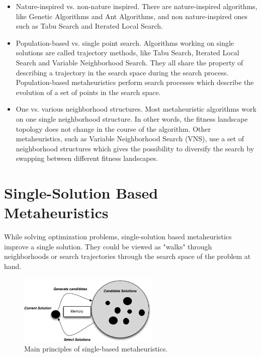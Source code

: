 \begin{itemize}
\item Nature-inspired vs. non-nature inspired. There are nature-inspired algorithms, like Genetic Algorithms and Ant Algorithms, and non nature-inspired ones such as Tabu Search and Iterated Local Search. 

\item Population-based vs. single point search. Algorithms working on single solutions are called trajectory methods, like Tabu Search, Iterated Local Search and Variable Neighborhood Search. They all share the property of describing a trajectory in the search space during the search process. Population-based metaheuristics perform search processes which describe the evolution of a set of points in the search space.

\item One vs. various neighborhood structures. Most metaheuristic algorithms work on one single neighborhood structure. In other words, the fitness landscape topology does not change in the course of the algorithm. Other metaheuristics, such as Variable Neighborhood Search (VNS), use a set of neighborhood structures which gives the possibility to diversify the search by swapping between different fitness
landscapes.
\end{itemize}

\section{Single-Solution Based Metaheuristics}

While solving optimization problems, single-solution based metaheuristics
 improve a single solution. They could be viewed as "walks" through neighborhoods or search trajectories through the search space of the problem at hand.
 
 \begin{figure}[h]
\centering
\includegraphics[width=0.6\textwidth]{./images/singlebased.png}
\caption{ Main principles of single-based metaheuristics.}
\label{fig:singlebased}
\end{figure}


